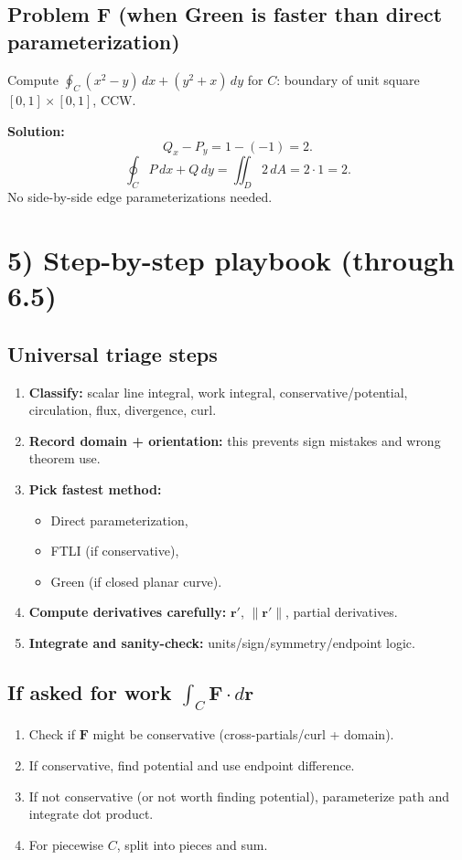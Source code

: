 \documentclass[12pt, twoside]{article}
\begin{document}
\subsection*{Problem F (when Green is faster than direct parameterization)}
Compute $\oint_C (x^2-y)\,dx+(y^2+x)\,dy$ for $C$: boundary of unit square $[0,1]\times[0,1]$, CCW.

\textbf{Solution:}
\[
Q_x-P_y=1-(-1)=2.
\]
\[
\oint_C P\,dx+Q\,dy=\iint_D2\,dA=2\cdot1=2.
\]
No side-by-side edge parameterizations needed.

\section*{5) Step-by-step playbook (through 6.5)}

\subsection*{Universal triage steps}
\begin{enumerate}[leftmargin=*]
  \item \textbf{Classify:} scalar line integral, work integral, conservative/potential, circulation, flux, divergence, curl.
  \item \textbf{Record domain + orientation:} this prevents sign mistakes and wrong theorem use.
  \item \textbf{Pick fastest method:}
  \begin{itemize}[leftmargin=*]
    \item Direct parameterization,
    \item FTLI (if conservative),
    \item Green (if closed planar curve).
  \end{itemize}
  \item \textbf{Compute derivatives carefully:} $\mathbf{r}'$, $\|\mathbf{r}'\|$, partial derivatives.
  \item \textbf{Integrate and sanity-check:} units/sign/symmetry/endpoint logic.
\end{enumerate}

\subsection*{If asked for work $\int_C\mathbf{F}\cdot d\mathbf{r}$}
\begin{enumerate}[leftmargin=*]
  \item Check if $\mathbf{F}$ might be conservative (cross-partials/curl + domain).
  \item If conservative, find potential and use endpoint difference.
  \item If not conservative (or not worth finding potential), parameterize path and integrate dot product.
  \item For piecewise $C$, split into pieces and sum.
\end{enumerate}
\end{document}
